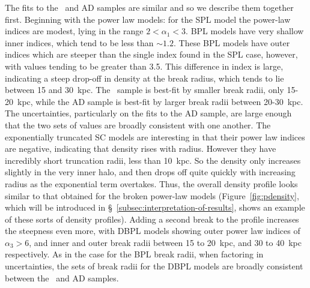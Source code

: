 The fits to the \eLz\ and AD samples are similar and so we describe them together first. Beginning with the power law models: for the SPL model the power-law indices are modest, lying in the range $2 < \alpha_{1} < 3$. BPL models have very shallow inner indices, which tend to be less than $\sim 1.2$. These BPL models have outer indices which are steeper than the single index found in the SPL case, however, with values tending to be greater than 3.5. This difference in index is large, indicating a steep drop-off in density at the break radius, which tends to lie between 15 and 30~kpc. The \eLz\ sample is best-fit by smaller break radii, only 15-20~kpc, while the AD sample is best-fit by larger break radii between 20-30~kpc. The uncertainties, particularly on the fits to the AD sample, are large enough that the two sets of values are broadly consistent with one another. The exponentially truncated SC models are interesting in that their power law indices are negative, indicating that density rises with radius. However they have incredibly short truncation radii, less than 10~kpc. So the density only increases slightly in the very inner halo, and then drops off quite quickly with increasing radius as the exponential term overtakes. Thus, the overall density profile looks similar to that obtained for the broken power-law models (Figure~\ref{fig:pdensity}, which will be introduced in \S~\ref{subsec:interpretation-of-results}, shows an example of these sorts of density profiles). Adding a second break to the profile increases the steepness even more, with DBPL models showing outer power law indices of $\alpha_{3} > 6$, and inner and outer break radii between 15 to 20~kpc, and 30 to 40~kpc respectively. As in the case for the BPL break radii, when factoring in uncertainties, the sets of break radii for the DBPL models are broadly consistent between the \eLz\ and AD samples.


